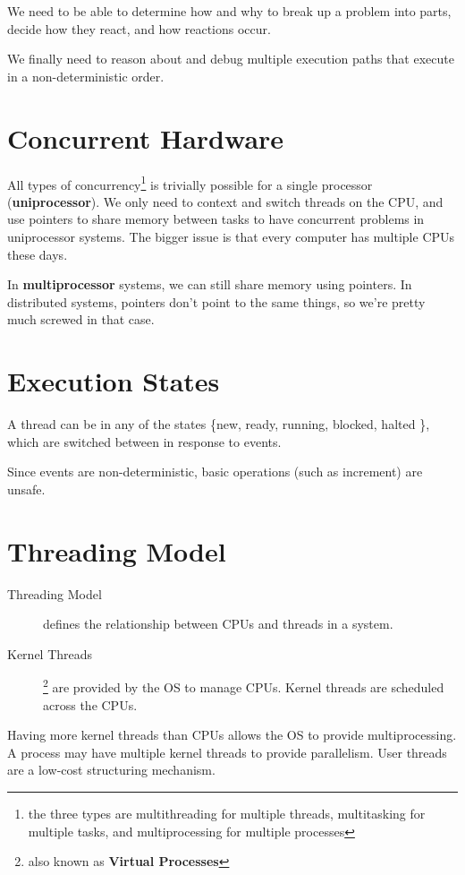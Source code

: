             We need to be able to determine how and why to break up a problem into parts, decide how they react, and how reactions occur.

            We finally need to reason about and debug multiple execution paths that execute in a non-deterministic order.
        \section{Concurrent Hardware} %
        \label{sec:concurrent_hardware}
            All types of concurrency\footnote{the three types are multithreading for multiple threads, multitasking for multiple tasks, and multiprocessing for multiple processes} is trivially possible for a single processor (\textbf{uniprocessor}).
            We only need to context and switch threads on the CPU, and use pointers to share memory between tasks to have concurrent problems in uniprocessor systems.
            The bigger issue is that every computer has multiple CPUs these days.

            In \textbf{multiprocessor} systems, we can still share memory using pointers.
            In distributed systems, pointers don't point to the same things, so we're pretty much screwed in that case.
        \section{Execution States} %
        \label{sec:execution_states}
            A thread can be in any of the states \{new, ready, running, blocked, halted \}, which are switched between in response to events.

            Since events are non-deterministic, basic operations (such as increment) are unsafe.
        \section{Threading Model} %
        \label{sec:threading_model}
            \begin{description}
                \item[Threading Model] defines the relationship between CPUs and threads in a system.
                \item[Kernel Threads]\footnote{also known as \textbf{Virtual Processes}} are provided by the OS to manage CPUs.
                Kernel threads are scheduled across the CPUs.
            \end{description}
            Having more kernel threads than CPUs allows the OS to provide multiprocessing.
            A process may have multiple kernel threads to provide parallelism.
            User threads are a low-cost structuring mechanism.


